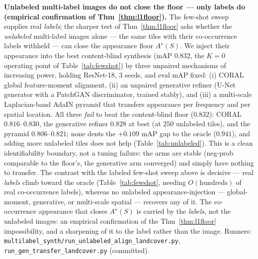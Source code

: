 \documentclass[11pt]{article}
\begin{document}
\textbf{Unlabeled multi-label images do not close the floor --- only labels do (empirical
confirmation of Thm~\ref{thm:l1floor}).} The few-shot sweep supplies real \emph{labels}; the
sharper test of Thm~\ref{thm:l1floor} asks whether the \emph{unlabeled} multi-label images alone
--- the same tiles with their co-occurrence labels withheld --- can close the appearance floor
$A^\star(S)$. We inject their appearance into the best content-blind synthesis (mAP $0.832$, the
$K{=}0$ operating point of Table~\ref{tab:fewshot}) by three unpaired mechanisms of increasing
power, holding ResNet-18, $3$ seeds, and eval mAP fixed: (i) CORAL global feature-moment
alignment, (ii) an unpaired generative refiner (U-Net generator with a PatchGAN discriminator,
trained stably), and (iii) a multi-scale Laplacian-band AdaIN pyramid that transfers appearance
per frequency and per spatial location. All three \emph{fail} to beat the content-blind floor
($0.832$): CORAL $0.816$--$0.830$, the generative refiner $0.828$ at best (at $250$ unlabeled
tiles), and the pyramid $0.806$--$0.821$; none dents the $+0.109$ mAP gap to the oracle ($0.941$),
and adding more unlabeled tiles does not help (Table~\ref{tab:unlabeled}). This is a clean
identifiability boundary, not a tuning failure: the arms are stable (neg-prob comparable to the
floor's, the generative arm converged) and simply have nothing to transfer. The contrast with the
labeled few-shot sweep above is decisive --- real \emph{labels} climb toward the oracle
(Table~\ref{tab:fewshot}, needing $O(\mathrm{hundreds})$ of real co-occurrence labels), whereas no
unlabeled appearance-injection --- global-moment, generative, or multi-scale spatial --- recovers
any of it. The co-occurrence appearance that closes $A^\star(S)$ is carried by the \emph{labels},
not the unlabeled images: an empirical confirmation of the Thm~\ref{thm:l1floor} impossibility, and
a sharpening of it to the label rather than the image. Runners:
\texttt{multilabel\_synth/run\_unlabeled\_align\_landcover.py},
\texttt{run\_gen\_transfer\_landcover.py} (committed).
\end{document}
